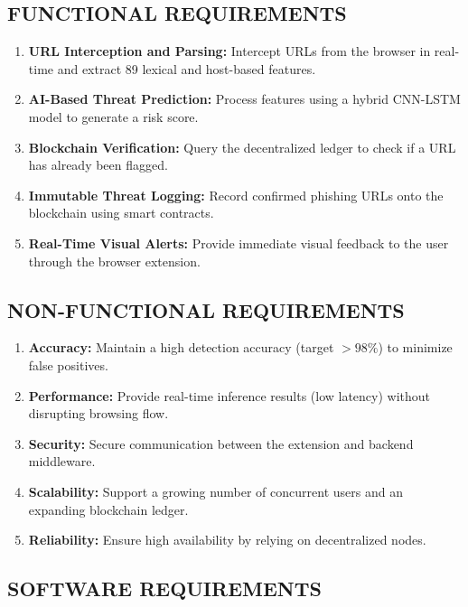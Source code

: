 \subsection{FUNCTIONAL REQUIREMENTS}

\begin{enumerate}
\item \textbf{URL Interception and Parsing:} Intercept URLs from the browser in real-time and extract 89 lexical and host-based features.
\item \textbf{AI-Based Threat Prediction:} Process features using a hybrid CNN-LSTM model to generate a risk score.
\item \textbf{Blockchain Verification:} Query the decentralized ledger to check if a URL has already been flagged.
\item \textbf{Immutable Threat Logging:} Record confirmed phishing URLs onto the blockchain using smart contracts.
\item \textbf{Real-Time Visual Alerts:} Provide immediate visual feedback to the user through the browser extension.
\end{enumerate}

\subsection{NON-FUNCTIONAL REQUIREMENTS}

\begin{enumerate}
\item \textbf{Accuracy:} Maintain a high detection accuracy (target $>98\%$) to minimize false positives.
\item \textbf{Performance:} Provide real-time inference results (low latency) without disrupting browsing flow.
\item \textbf{Security:} Secure communication between the extension and backend middleware.
\item \textbf{Scalability:} Support a growing number of concurrent users and an expanding blockchain ledger.
\item \textbf{Reliability:} Ensure high availability by relying on decentralized nodes.
\end{enumerate}

\newpage

\subsection{SOFTWARE REQUIREMENTS}

